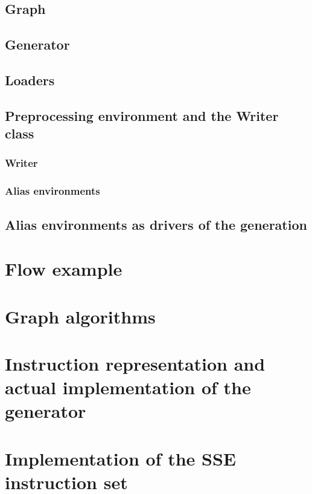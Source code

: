         \subsection{Graph}

        \subsection{Generator}

        \subsection{Loaders}

        \subsection{Preprocessing environment and the Writer class}

            \subsubsection{Writer}

            \subsubsection{Alias environments}

        \subsection{Alias environments as drivers of the generation}

    \section{Flow example}

    \section{Graph algorithms}

    \section{Instruction representation and actual implementation of the generator}


\section{Implementation of the SSE instruction set}

